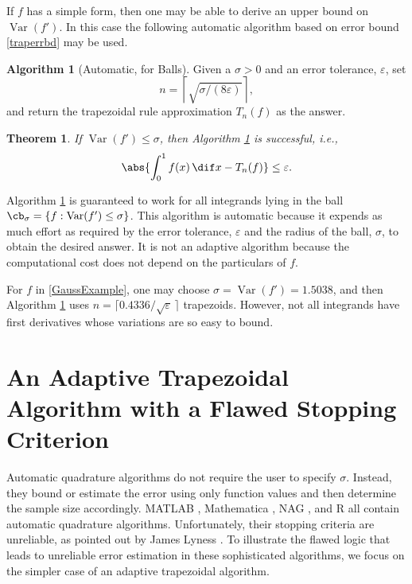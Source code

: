 \documentclass[]{amsart}
\DeclareMathOperator{\Var}{Var}
\newtheorem{theorem}{Theorem}
\theoremstyle{definition}
\newtheorem{algo}{Algorithm}
\theoremstyle{remark}
\begin{document}
If $f$ has a simple form, then one may be able to derive an upper bound on $\Var(f')$.  In this case the following automatic algorithm based on error bound \eqref{traperrbd} may be used.  

\begin{algo}[Automatic, for Balls] \label{ballalgo} Given a $\sigma>0$ and an error tolerance, $\varepsilon$, set 
\begin{equation}\label{algo1n}
n = \left \lceil \sqrt{\sigma/(8\varepsilon)} \right \rceil,
\end{equation}
and return the trapezoidal rule approximation $T_n(f)$ as the answer.
\end{algo}
\begin{theorem} \label{ballalgothm} If $\Var(f') \le \sigma$, then Algorithm \ref{ballalgo} is successful, i.e., 
\[
\abs{\int_0^1 f(x) \, \dif x - T_n(f)}\le \varepsilon.
\]
\end{theorem}

Algorithm \ref{ballalgo} is guaranteed to work for all integrands lying in the ball $\cb_{\sigma}=\{f : \Var(f') \le \sigma\}$.  This algorithm is automatic because it expends as much effort as required by the error tolerance, $\varepsilon$ and the radius of the ball, $\sigma$, to obtain the desired answer.  It is not an adaptive algorithm because the computational cost does not depend on the particulars of $f$.

For $f$ in \eqref{GaussExample}, one may choose $\sigma=\Var(f')=1.5038$, and then Algorithm \ref{ballalgo} uses $n = \lceil 0.4336/\sqrt{\varepsilon}\, \rceil$ trapezoids.  However, not all integrands have first derivatives whose variations are so easy to bound.  

\section{An Adaptive Trapezoidal Algorithm with a Flawed Stopping Criterion} \label{flawstopsec}

Automatic quadrature algorithms do not require the user to specify $\sigma$.  Instead, they bound or estimate the error using only function values and then determine the sample size accordingly.  MATLAB , Mathematica , NAG , and R  all contain automatic quadrature algorithms.  Unfortunately, their stopping criteria are unreliable, as pointed out by James Lyness .  To illustrate the flawed logic that leads to unreliable error estimation in these sophisticated algorithms, we focus on the simpler case of an adaptive trapezoidal algorithm.
\end{document}
